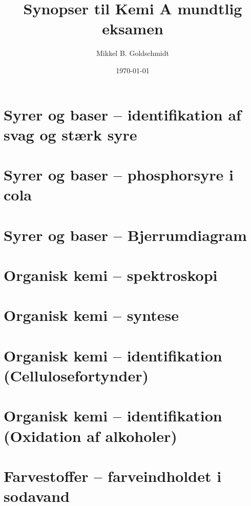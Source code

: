 \documentclass[10pt,a4paper]{article}
\author{Mikkel B. Goldschmidt}
\title{Synopser til Kemi A mundtlig eksamen}
\date{\today}
\theoremstyle{break}
\theoremstyle{nonumberplain}
\begin{document}
\maketitle
\tableofcontents
\pagebreak

\section{Syrer og baser – identifikation af svag og stærk syre}

\pagebreak


\section{Syrer og baser – phosphorsyre i cola}

\pagebreak


\section{Syrer og baser – Bjerrumdiagram}

\pagebreak


\section{Organisk kemi – spektroskopi}

\pagebreak


\section{Organisk kemi – syntese}

\pagebreak


\section{Organisk kemi – identifikation (Cellulosefortynder)}

\pagebreak

\section{Organisk kemi – identifikation (Oxidation af alkoholer)}

\pagebreak


\section{Farvestoffer – farveindholdet i sodavand}

\pagebreak
\end{document}
